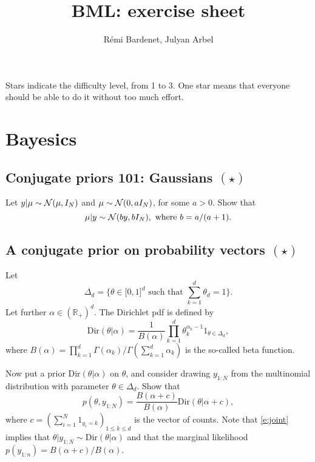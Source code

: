 \documentclass{article}
\title{BML: exercise sheet}
\date{}
\author{R\'emi Bardenet, Julyan Arbel}
\newif\ifsolutions
\newcommand\solution[1]{
\ifsolutions
\begin{mdframed}[style=MyFrame]
\textcolor{bleu}{\textbf{Solution:} #1}
\end{mdframed}
\fi
}
\begin{document}
\maketitle

Stars indicate the difficulty level, from 1 to 3. One star means that everyone should be able to do it without too much effort.

\tableofcontents

\section{Bayesics}

\subsection{Conjugate priors 101: Gaussians $(\star)$}
\label{s:gaussianConjugacy}
Let $y\vert\mu \sim \mathcal{N}(\mu,I_N)$ and $\mu\sim \mathcal{N}(0,a I_N)$, for some $a>0$. Show that
\begin{equation}
  \mu\vert y \sim \mathcal{N}(b y,bI_N), \text{ where } b=a/(a+1).
  \label{e:gaussianConjugacy}
\end{equation}

\solution{
We apply Bayes' theorem and keep track of only the terms that will not end up in the normalization constant of the posterior. This gives
\begin{align*}
  \log p(\mu\vert y) &\propto \log p(y\vert\mu) + \log p(\mu)\\
  &\propto - \frac{\Vert y-\mu\Vert^2}{2} - \frac{\Vert \mu\Vert^2}{2a}\\
  & \propto -\frac12 \Vert\mu\Vert^2\left(1+\frac1a \right) + y^T\mu\\
  & \propto - \frac{\Vert \mu - by\Vert^2}{2b}.
\end{align*}
}

\subsection{A conjugate prior on probability vectors $(\star)$}
Let
$$
\Delta_d = \{\theta\in\mathbb[0,1]^d \text{ such that } \sum_{k=1}^d \theta_d = 1\}.
$$
Let further $\alpha\in(\mathbb{R}_+)^d$. 
The Dirichlet pdf is defined by
 $$
 \text{Dir}(\theta\vert \alpha) = \frac{1}{B(\alpha)} \prod_{k=1}^d \theta_k^{\alpha_k -1} 1_{\theta\in \Delta_d},$$
where
 $ B(\alpha) = \prod_{k=1}^d \Gamma(\alpha_k) / \Gamma(\sum_{k=1}^d \alpha_k)$
 is the so-called beta function.

 Now put a prior $\text{Dir}(\theta\vert \alpha)$ on $\theta$, and consider drawing $y_{1:N}$ from the multinomial distribution with parameter $\theta\in\Delta_d$. Show that
 \begin{equation}
   p(\theta, y_{1:N}) = \frac{B(\alpha+c)}{B(\alpha)} \text{Dir}(\theta\vert \alpha + c),
\label{e:joint}
 \end{equation}
 where $c=(\sum_{i=1}^N 1_{y_i=k})_{1\leq k \leq d}$ is the vector of counts. 
 Note that \eqref{e:joint} implies that $\theta\vert y_{1:N} \sim \text{Dir}(\theta\vert \alpha)$ and that the marginal likelihood $p(y_{1:n}) = B(\alpha+c)/B(\alpha)$.
\end{document}
